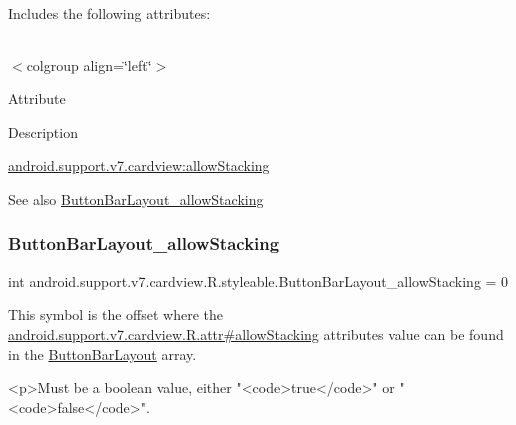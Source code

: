 Includes the following attributes\+:

\tabulinesep=1mm
\begin{longtabu} spread 0pt [c]{*{0}{|X[-1]}|}
\hline
\end{longtabu}
$<$colgroup align=\char`\"{}left\char`\"{}$>$ 

Attribute

Description 

{\ttfamily \hyperlink{classandroid_1_1support_1_1v7_1_1cardview_1_1R_1_1styleable_a33f807242d99bbecae8b32d75a0f027e}{android.\+support.\+v7.\+cardview\+:allow\+Stacking}}

\begin{DoxySeeAlso}{See also}
\hyperlink{classandroid_1_1support_1_1v7_1_1cardview_1_1R_1_1styleable_a33f807242d99bbecae8b32d75a0f027e}{Button\+Bar\+Layout\+\_\+allow\+Stacking} 
\end{DoxySeeAlso}
\mbox{\label{classandroid_1_1support_1_1v7_1_1cardview_1_1R_1_1styleable_a33f807242d99bbecae8b32d75a0f027e}} 
\subsubsection{\texorpdfstring{Button\+Bar\+Layout\+\_\+allow\+Stacking}{ButtonBarLayout\_allowStacking}}
{\footnotesize\ttfamily int android.\+support.\+v7.\+cardview.\+R.\+styleable.\+Button\+Bar\+Layout\+\_\+allow\+Stacking = 0\hspace{0.3cm}{\ttfamily [static]}}

This symbol is the offset where the \hyperlink{classandroid_1_1support_1_1v7_1_1cardview_1_1R_1_1attr_a94a46df52b8cc0f96c6d082ef05258c3}{android.\+support.\+v7.\+cardview.\+R.\+attr\#allow\+Stacking} attribute\textquotesingle{}s value can be found in the \hyperlink{classandroid_1_1support_1_1v7_1_1cardview_1_1R_1_1styleable_aaef402690ee9d9aa4bf6e3b5b46f95dd}{Button\+Bar\+Layout} array.

\begin{DoxyVerb}      <p>Must be a boolean value, either "<code>true</code>" or "<code>false</code>".
\end{DoxyVerb}
 

